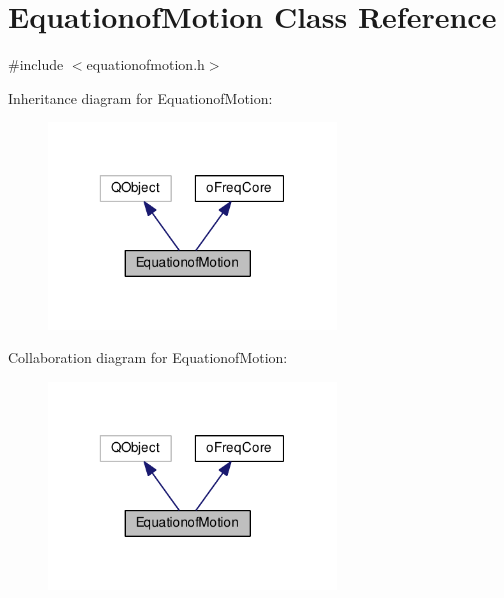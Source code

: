 \hypertarget{class_equationof_motion}{\section{Equationof\-Motion Class Reference}
\label{class_equationof_motion}
}


{\ttfamily \#include $<$equationofmotion.\-h$>$}



Inheritance diagram for Equationof\-Motion\-:\nopagebreak
\begin{figure}[H]
\begin{center}
\leavevmode
\includegraphics[width=217pt]{class_equationof_motion__inherit__graph}
\end{center}
\end{figure}


Collaboration diagram for Equationof\-Motion\-:\nopagebreak
\begin{figure}[H]
\begin{center}
\leavevmode
\includegraphics[width=217pt]{class_equationof_motion__coll__graph}
\end{center}
\end{figure}

